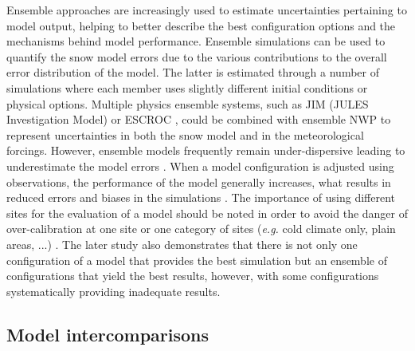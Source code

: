 \documentclass[utf8]{frontiersSCNS} %
\begin{document}
Ensemble approaches are increasingly used to estimate uncertainties pertaining to model output, helping to better describe the best configuration options and the mechanisms behind model performance. Ensemble simulations can be used to quantify the snow model errors due to the various contributions to the overall error distribution of the model. The latter is estimated through a number of simulations where each member uses slightly different initial conditions or physical options.  Multiple physics ensemble systems, such as JIM (JULES Investigation Model) \citep{Essery_2013,Raleigh_2015} or ESCROC \citep{Lafaysse_2017}, could be combined with ensemble NWP \citep{Molteni_1996,Descamps_2015,vernay2015} to represent uncertainties in both the snow model and in the meteorological forcings. However, ensemble models frequently remain under-dispersive leading to underestimate the model errors \citep{Vannitsem_2018}. When a model configuration is adjusted using observations, the performance of the model generally increases, what results in reduced errors and biases in the simulations \citep{Essery_2013}. The importance of using different sites for the evaluation of a model should be noted in order to avoid the danger of over-calibration at one site or one category of sites (\textit{e.g.} cold climate only, plain areas, ...) \citep{Essery_2013}.
The later study also demonstrates that there is not only one configuration of a model that provides the best simulation but an ensemble of configurations that yield the best results, however, with some configurations systematically providing inadequate results.


\subsection{Model intercomparisons}
\end{document}
